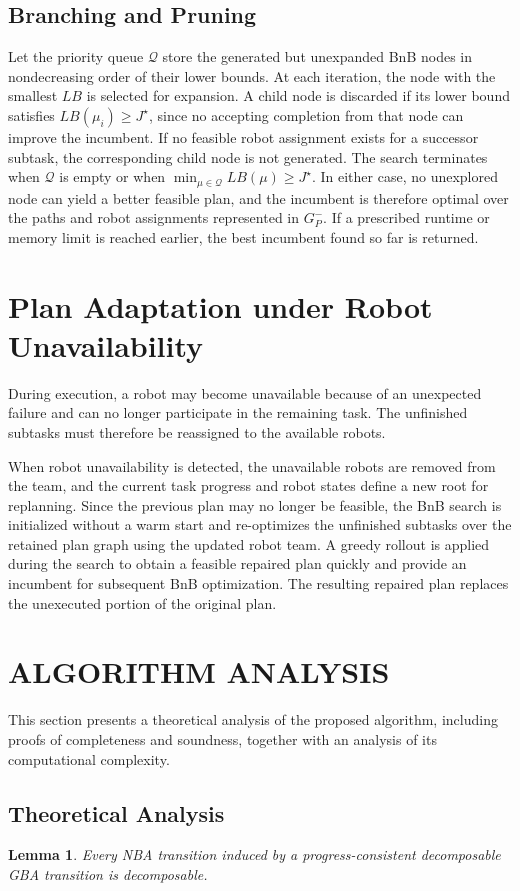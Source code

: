 \documentclass[lettersize,journal]{IEEEtran}
\theoremstyle{italiclemma}
\newtheorem{lemma}{Lemma}
\theoremstyle{italiclemma}
\theoremstyle{definition}
\begin{document}
\subsection{Branching and Pruning}
Let the priority queue $\mathcal Q$ store the generated but unexpanded BnB nodes in nondecreasing order of their lower bounds. At each iteration, the node with the smallest $LB$ is selected for expansion. A child node is discarded if its lower bound satisfies $LB(\mu_i)\geq J^\star$, since no accepting completion from that node
can improve the incumbent. If no feasible robot assignment exists for a successor subtask, the corresponding child node is not generated.
The search terminates when $\mathcal Q$ is empty or when $\min_{\mu\in\mathcal Q}LB(\mu)\geq J^\star$. In either case, no unexplored node can yield a better feasible plan, and the incumbent is therefore optimal over the paths and robot assignments represented in $G_P^{-}$. 
If a prescribed runtime or memory limit is reached earlier, the
best incumbent found so far is returned.


\section{Plan Adaptation under Robot Unavailability}
\label{sec:plan_adaptation}
During execution, a robot may become unavailable because of an unexpected failure and can no longer participate in the remaining task. The unfinished subtasks must therefore be reassigned to the available robots.

When robot unavailability is detected, the unavailable robots are removed from the team, and the current task progress and robot states define a new root for replanning. Since the previous plan may no longer
be feasible, the BnB search is initialized without a warm start and re-optimizes the unfinished subtasks over the retained plan graph using the updated robot team. A greedy rollout is applied during the search to obtain a feasible repaired plan quickly and provide an incumbent for
subsequent BnB optimization. The resulting repaired plan replaces the unexecuted portion of the original plan.
\section{ALGORITHM ANALYSIS} \label{sec:theoretical_analysis}
This section presents a theoretical analysis of the proposed algorithm, including proofs of completeness and soundness, together with an analysis of its computational complexity.
\subsection{Theoretical Analysis}
\begin{lemma}\label{l1}
Every NBA transition induced by a progress-consistent decomposable GBA transition is decomposable.
\end{lemma}
\end{document}
